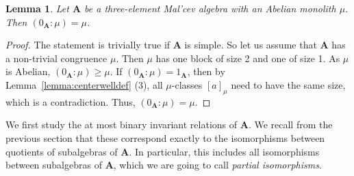 \documentclass[12pt]{amsart}
\newtheorem{lemma}[theorem]{Lemma}
\theoremstyle{definition}
\theoremstyle{definition}
\newcommand{\alg}[1]{\mathbf{#1}}
\newcommand{\algA}{\alg{A}}
\begin{document}
\begin{lemma} \label{lemma:centralizer}
Let $\alg{A}$ be a three-element Mal'cev algebra with an Abelian monolith $\mu$. Then $(0_{\alg{A}} : \mu) = \mu$.
\end{lemma}

\begin{proof}
The statement is trivially true if $\mathbf{A}$ is simple. So let us assume that $\mathbf{A}$ has a non-trivial congruence $\mu$. Then $\mu$ has one block of size 2 and one of size 1. As $\mu$ is Abelian, $(0_{\alg{A}} : \mu) \geq \mu$. If $(0_{\alg{A}} : \mu) = 1_{\alg{A}}$, then by Lemma~\ref{lemma:centerwelldef} (3), all $\mu$-classes $[a]_\mu$ need to have the same size, which is a contradiction. Thus, $(0_{\alg{A}} : \mu) = \mu$.
\end{proof}

We first study the at most binary invariant relations of $\alg{A}$. We recall from the previous section that these correspond exactly to the isomorphisms between quotients of subalgebras of $\algA$. In particular, this includes all isomorphisms between subalgebras of $\alg{A}$, which we are going to call \emph{partial isomorphisms}.
\end{document}
